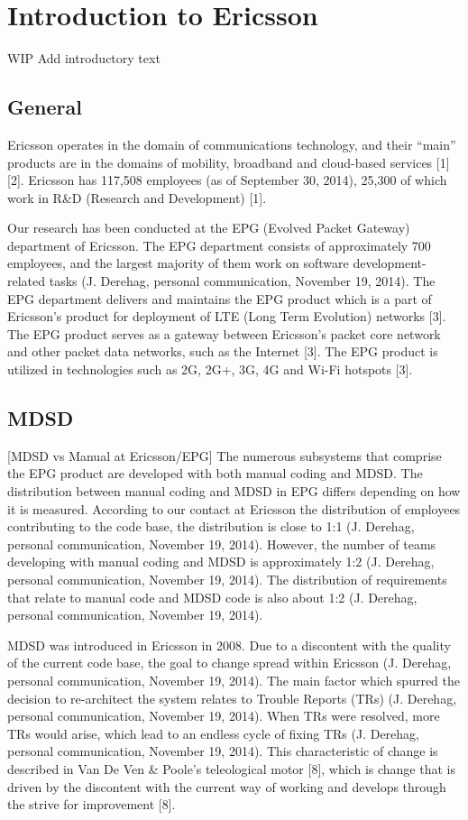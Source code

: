\documentclass[final_report_innit.tex]{subfiles}
\begin{document}
\section{Introduction to Ericsson}
WIP
Add introductory text

\subsection*{General}
Ericsson operates in the domain of communications technology, and their “main” products are in the domains of mobility, broadband and cloud-based services [1] [2]. Ericsson has 117,508 employees (as of September 30, 2014), 25,300 of which work in R\&D (Research and Development) [1].

Our research has been conducted at the EPG (Evolved Packet Gateway) department of Ericsson. The EPG department consists of approximately 700 employees, and the largest majority of them work on software development-related tasks (J. Derehag, personal communication, November 19, 2014). The EPG department delivers and maintains the EPG product which is a part of Ericsson’s product for deployment of LTE (Long Term Evolution) networks [3]. The EPG product serves as a gateway between Ericsson’s packet core network and other packet data networks, such as the Internet [3]. The EPG product is utilized in technologies such as 2G, 2G+, 3G, 4G and Wi-Fi hotspots [3].

\subsection*{MDSD}
[MDSD vs Manual at Ericsson/EPG]
The numerous subsystems that comprise the EPG product are developed with both manual coding and MDSD. The distribution between manual coding and MDSD in EPG differs depending on how it is measured. According to our contact at Ericsson the distribution of employees contributing to the code base, the distribution is close to 1:1 (J. Derehag, personal communication, November 19, 2014). However, the number of teams developing with manual coding and MDSD is approximately 1:2 (J. Derehag, personal communication, November 19, 2014). The distribution of requirements that relate to manual code and MDSD code is also about 1:2 (J. Derehag, personal communication, November 19, 2014).

MDSD was introduced in Ericsson in 2008. Due to a discontent with the quality of the current code base, the goal to change spread within Ericsson (J. Derehag, personal communication, November 19, 2014). The main factor which spurred the decision to re-architect the system relates to Trouble Reports (TRs) (J. Derehag, personal communication, November 19, 2014). When TRs were resolved, more TRs would arise, which lead to an endless cycle of fixing TRs (J. Derehag, personal communication, November 19, 2014). This characteristic of change is described in Van De Ven \& Poole’s teleological motor [8], which is change that is driven by the discontent with the current way of working and develops through the strive for improvement [8]. 
\end{document}
